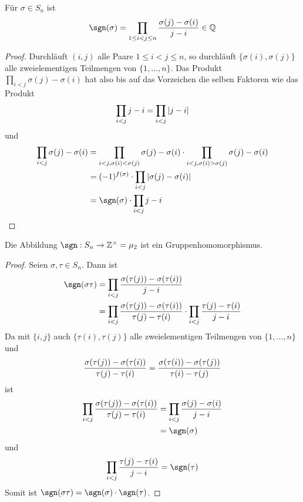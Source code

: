 \begin{lemma}
	Für $\sigma\in S_n$ ist
	\begin{align}
		\sgn(\sigma)=\prod_{1\le i<j\le n} \frac{\sigma(j)-\sigma(i)}{j-i}\in \mathbb Q\notag
	\end{align}
\end{lemma}
\begin{proof}
	Durchläuft $(i,j)$ alle Paare $1\le i<j\le n$, so durchläuft $\{\sigma(i),\sigma(j)\}$ alle zweielementigen Teilmengen von $\{1,...,
	n\}$. Das Produkt $\prod_{i<j} \sigma(j)-\sigma(i)$ hat also bis auf das Vorzeichen die selben Faktoren wie das Produkt 
	\begin{align}
		\prod_{i<j} j-i=\prod_{i<j} |j-i|\notag
	\end{align}
	 und
	 \begin{align}
	 	\prod_{i<j} \sigma(j)-\sigma(i)&=\prod_{i<j,\sigma(i)<\sigma(j)} 
	 	\sigma(j)-\sigma(i) \cdot \prod_{i<j,\sigma(i)>\sigma(j)} \sigma(j)-\sigma(i) \notag \\
	 	&=(-1)^{f(\sigma)}\cdot \prod_{i<j} |\sigma(j)-\sigma(i)| \notag \\
	 	&=\sgn(\sigma)\cdot \prod_{i<j} j-i \notag
	 \end{align}
\end{proof}

\begin{proposition}
	Die Abbildung $\sgn: S_n \to \mathbb Z^{\times}=\mu_2$ ist ein Gruppenhomomorphismus.
\end{proposition}
\begin{proof}
	Seien $\sigma,\tau\in S_n$. Dann ist
	\begin{align}
		\sgn(\sigma\tau)&=\prod_{i<j} \frac{\sigma(\tau(j))-\sigma(\tau(i))}{j-i} \notag \\
		&=\prod_{i<j} \frac{\sigma(\tau(j))-\sigma(\tau(i))}{\tau(j)-\tau(i)}\cdot \prod_{i<j} \frac{\tau(j)-\tau(i)}{j-i} \notag
	\end{align}
	Da mit $\{i,j\}$ auch $\{\tau(i),\tau(j)\}$ alle 
	zweielementigen Teilmengen von $\{1,...,n\}$ und 
	\begin{align}
		\frac{\sigma(\tau(j))-\sigma(\tau(i))}{\tau(j)-\tau(i)}=\frac{\sigma(\tau(i))-
			\sigma(\tau(j))}{\tau(i)-\tau(j)} \notag
	\end{align}
	ist 
	\begin{align}
		\prod_{i<j} \frac{\sigma(\tau(j))-\sigma(\tau(i))}{\tau(j)-\tau(i)}&=\prod_
		{i<j} \frac{\sigma(j)-\sigma(i)}{j-i} \notag \\
		&=\sgn(\sigma) \notag
	\end{align}
	und 
	\begin{align}
		\prod_{i<j} \frac{\tau(j)-\tau(i)}{j-i}=\sgn(\tau) \notag
	\end{align}
	Somit ist $\sgn(\sigma\tau)=\sgn(\sigma)\cdot \sgn(\tau)$.
\end{proof}

